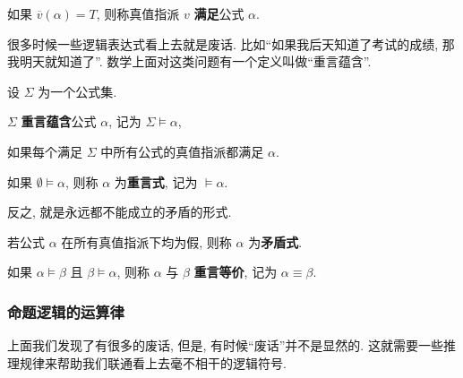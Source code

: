       \begin{definition}[满足 (Satisfy)]
        如果 $\overline{v}(\alpha) = T$, 则称真值指派 $v$ {\bf 满足}公式 $\alpha$. 
      \end{definition}

      很多时候一些逻辑表达式看上去就是废话. 比如``如果我后天知道了考试的成绩, 那我明天就知道了''. 数学上面对这类问题有一个定义叫做``重言蕴含''. 

      \begin{definition}
          设 $\Sigma$ 为一个公式集. 
    
          $\Sigma$ {\bf 重言蕴含}公式 $\alpha$,
          记为 $\Sigma \models \alpha$,
    
          如果{每个}满足 $\Sigma$ 中{所有}公式的真值指派都满足 $\alpha$. 
      \end{definition}

      \begin{definition}
        如果 $\emptyset \models \alpha$, 则称 $\alpha$ 为{\bf 重言式},
        记为 $\models \alpha$. 
      \end{definition}

      反之, 就是永远都不能成立的矛盾的形式. 
      
      \begin{definition}
        若公式 $\alpha$ 在所有真值指派下均为假, 则称 $\alpha$ 为{\bf 矛盾式}. 
      \end{definition}

      \begin{definition}
        如果 $\alpha \models \beta$ 且 $\beta \models \alpha$,
        则称 $\alpha$ 与 $\beta$ {\bf 重言等价}, 记为 $\alpha \equiv \beta$. 
      \end{definition}

      \subsubsection{命题逻辑的运算律}

      上面我们发现了有很多的废话, 但是, 有时候``废话''并不是显然的. 这就需要一些推理规律来帮助我们联通看上去毫不相干的逻辑符号. 

